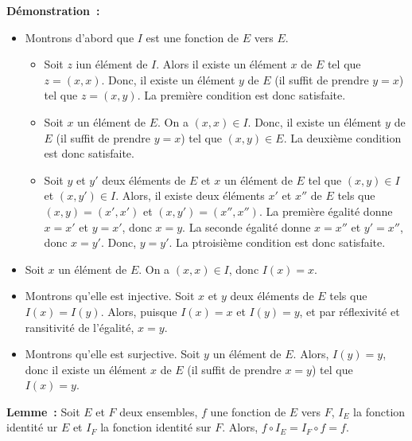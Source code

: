 \medskip 

\noindent\textbf{Démonstration :} 
\begin{itemize}[nosep]
    \item Montrons d'abord que $I$ est une fonction de $E$ vers $E$. 
        \begin{itemize}[nosep]
            \item Soit $z$ iun élément de $I$. 
                Alors il existe un élément $x$ de $E$ tel que $z = (x,x)$. 
                Donc, il existe un élément $y$ de $E$ (il suffit de prendre $y=x$) tel que $z = (x,y)$.
                La première condition est donc satisfaite.
            \item Soit $x$ un élément de $E$. 
                On a $(x,x) \in I$. 
                Donc, il existe un élément $y$ de $E$ (il suffit de prendre $y = x$) tel que $(x,y) \in E$.
                La deuxième condition est donc satisfaite.
            \item Soit $y$ et $y'$ deux éléments de $E$ et $x$ un élément de $E$ tel que $(x,y) \in I$ et $(x,y') \in I$.
                Alors, il existe deux éléments $x'$ et $x''$ de $E$ tels que $(x,y) = (x',x')$ et $(x,y') = (x'',x'')$. 
                La première égalité donne $x = x'$ et $y = x'$, donc $x = y$.
                La seconde égalité donne $x = x''$ et $y' = x''$, donc $x = y'$. 
                Donc, $y = y'$.
                La ptroisième condition est donc satisfaite.
        \end{itemize}
    \item Soit $x$ un élément de $E$.
        On a $(x,x) \in I$, donc $I(x) = x$.
    \item Montrons qu'elle est injective.
        Soit $x$ et $y$ deux éléments de $E$ tels que $I(x) = I(y)$. 
        Alors, puisque $I(x) = x$ et $I(y) = y$, et par réflexivité et ransitivité de l'égalité, $x = y$.
    \item Montrons qu'elle est surjective. 
        Soit $y$ un élément de $E$. 
        Alors, $I(y) = y$, donc il existe un élément $x$ de $E$ (il suffit de prendre $x = y$) tel que $I(x) = y$.
\end{itemize}

\done

\medskip

\noindent\textbf{Lemme :} Soit $E$ et $F$ deux ensembles, $f$ une fonction de $E$ vers $F$, $I_E$ la fonction identité ur $E$ et $I_F$ la fonction identité sur $F$. 
    Alors, $f \circ I_E = I_F \circ f = f$.

